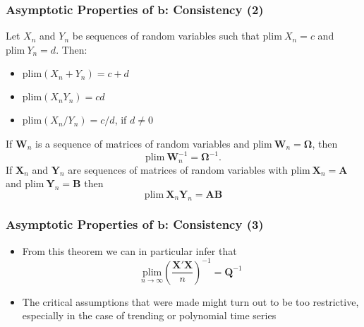 \documentclass[10pt]{beamer}
\newcommand{\plim}{\mathrm{plim}}
\theoremstyle{definition}
\begin{document}
\begin{frame}[fragile]
	\frametitle{Asymptotic Properties of $\mathbf{b}$: Consistency (2)}
	\begin{theorem}
		Let $ X_{n} $ and $ Y_{n} $ be sequences of random variables such that $ \plim\ X_{n} = c$ and $ \plim\ Y_{n} = d $. Then:
		\begin{itemize}
			\item $\plim(X_{n} + Y_{n}) = c + d$
			\item $\plim(X_{n}Y_{n}) = cd$
			\item $\plim(X_{n}/Y_{n}) = c/d$, if $ d \neq 0 $
		\end{itemize}
		If $ \mathbf{W}_{n} $ is a sequence of matrices of random variables and $ \plim\ \mathbf{W}_{n} = \boldsymbol\Omega $, then
		\[
			\plim\ \mathbf{W}_{n}^{-1} = \boldsymbol\Omega^{-1}.
		\]
		If $ \mathbf{X}_{n} $ and $ \mathbf{Y}_{n} $ are sequences of matrices of random variables with $ \plim\ \mathbf{X}_{n} = \mathbf{A}$ and $ \plim\ \mathbf{Y}_{n} = \mathbf{B}$ then
		\[
		\plim\ \mathbf{X}_{n}\mathbf{Y}_{n} = \mathbf{AB}
		\]
	\end{theorem}
	\end{frame}

\begin{frame}[fragile]
	\frametitle{Asymptotic Properties of $\mathbf{b}$: Consistency (3)}
	\begin{itemize}
		\item From this theorem we can in particular infer that 
		\[
			\underset{n\to\infty}{\plim}\left(\frac{\mathbf{X'X}}{n}\right)^{-1} = \mathbf{Q}^{-1}
		\]
		
		\item The critical assumptions that were made might turn out to be too restrictive, especially in the case of trending or polynomial time series
	\end{itemize}
\end{frame}
\end{document}
